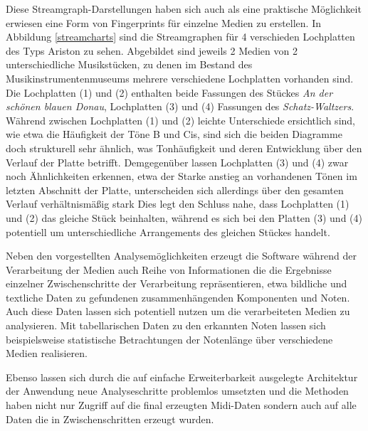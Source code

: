 Diese Streamgraph-Darstellungen haben sich auch als eine praktische Möglichkeit erwiesen eine Form von Fingerprints für einzelne Medien zu erstellen.
In Abbildung \ref{streamcharts} sind die Streamgraphen für 4 verschieden Lochplatten des Typs Ariston zu sehen.
Abgebildet sind jeweils 2 Medien von 2 unterschiedliche Musikstücken, zu denen im Bestand des Musikinstrumentenmuseums mehrere verschiedene Lochplatten vorhanden sind.
Die Lochplatten (1) und (2) enthalten beide Fassungen des Stückes \textit{An der schönen blauen Donau}, Lochplatten (3) und (4) Fassungen des \textit{Schatz-Waltzers}.
Während zwischen Lochplatten (1) und (2) leichte Unterschiede ersichtlich sind, wie etwa die Häufigkeit der Töne B und Cis, sind sich die beiden Diagramme doch strukturell sehr ähnlich, was Tonhäufigkeit und deren Entwicklung über den Verlauf der Platte betrifft.
Demgegenüber lassen Lochplatten (3) und (4) zwar noch Ähnlichkeiten erkennen, etwa der Starke anstieg an vorhandenen Tönen im letzten Abschnitt der Platte, unterscheiden sich allerdings über den gesamten Verlauf verhältnismäßig stark
Dies legt den Schluss nahe, dass Lochplatten (1) und (2) das gleiche Stück beinhalten, während es sich bei den Platten (3) und (4) potentiell um unterschiedliche Arrangements des gleichen Stückes handelt.

Neben den vorgestellten Analysemöglichkeiten erzeugt die Software während der Verarbeitung der Medien auch Reihe von Informationen die die Ergebnisse einzelner Zwischenschritte der Verarbeitung repräsentieren, etwa bildliche und textliche Daten zu gefundenen zusammenhängenden Komponenten und Noten.
Auch diese Daten lassen sich potentiell nutzen um die verarbeiteten Medien zu analysieren.
Mit tabellarischen Daten zu den erkannten Noten lassen sich beispielsweise statistische Betrachtungen der Notenlänge über verschiedene Medien realisieren.

Ebenso lassen sich durch die auf einfache Erweiterbarkeit ausgelegte Architektur der Anwendung neue Analyseschritte problemlos umsetzten und die Methoden haben nicht nur Zugriff auf die final erzeugten Midi-Daten sondern auch auf alle Daten die in Zwischenschritten erzeugt wurden.
